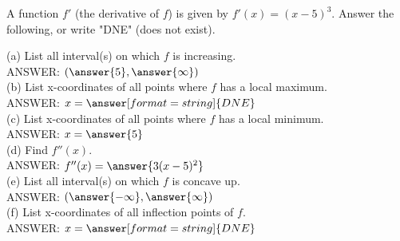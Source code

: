 \documentclass{ximera}
\begin{document}

\begin{exercise}
A function $f'$ (the derivative of $f$) is given by $f'(x)=(x-5)^3$. Answer the following, or write  "DNE" (does not exist).

(a) List all interval(s) on which $f$ is increasing.\\


ANSWER: $(\answer{5},\answer{\infty})$\\


(b) List x-coordinates of all points where $f$ has a local maximum. \\

ANSWER: $x=\answer[format=string]{DNE}$\\

(c)  List x-coordinates of all points where $f$ has a local minimum.\\

ANSWER: $x=\answer{5}$\\

(d) Find  $f''(x)$.\\

ANSWER: $f''(x)=\answer{3(x-5)^2}$\\

(e) List all interval(s) on which $f$ is concave up.\\

ANSWER:  $(\answer{-\infty},\answer{\infty})$\\

(f) List x-coordinates of all inflection points of $f$.\\

 ANSWER: $x=\answer[format=string]{DNE}$\\

\end{exercise}
\end{document}
